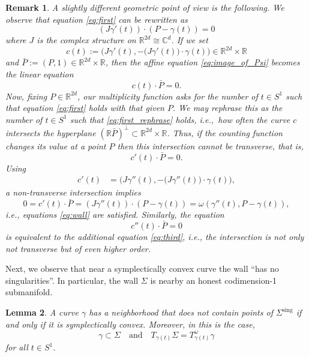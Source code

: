 \documentclass[12pt]{article}
\newtheorem{lemma}{Lemma}[section]
\newtheorem{remark}[lemma]{Remark}
\newcommand{\g}{{\gamma}}
\newcommand{\C}{{\mathbb C}}
\newcommand{\R}{{\mathbb R}}
\begin{document}
\begin{remark}
{A slightly different geometric point of view is the following. We observe that equation \eqref{eq:first} can be rewritten as
\begin{equation}\label{eq:image_of_Psi}
(J\gamma'(t))\cdot (P-\gamma(t))=0
\end{equation}
where $J$ is the complex structure on $\R^{2d}\cong\C^d$. If we set 
$$
c(t):=\Big(J\gamma'(t),-\big(J\gamma'(t)\big)\cdot\gamma(t) \Big)\in\R^{2d}\times\R
$$
and $\bar P:=(P,1)\in\R^{2d}\times\R$, then the affine equation \eqref{eq:image_of_Psi} becomes the linear equation
\begin{equation}\label{eq:first_rephrase}
c(t)\cdot \bar P=0.
\end{equation}
%
Now, fixing $P\in\R^{2d}$, our multiplicity function asks for the number of $t\in S^1$ such that equation \eqref{eq:first} holds with that given $P$. We may rephrase this as the number of $t\in S^1$ such that \eqref{eq:first_rephrase} holds, i.e.,~how often the curve $c$ intersects the hyperplane $(\R\bar P)^\perp\subset\R^{2d}\times\R$. Thus, if the counting function changes its value at a point $P$ then this  intersection cannot be transverse, that is, 
$$
c'(t)\cdot \bar P=0.
$$
Using
\begin{equation}\nonumber
\begin{aligned}
c'(t)%
&=\Big(J\gamma''(t),-\big(J\gamma''(t)\big)\cdot\gamma(t)\Big),
\end{aligned}
\end{equation}
a non-transverse intersection implies
\begin{equation}\nonumber
0=c'(t)\cdot \bar P=(J\gamma''(t))\cdot (P-\gamma(t))=\omega(\gamma''(t),P-\gamma(t)),
\end{equation}
i.e., equations \eqref{eq:wall} are satisfied.  Similarly, the equation 
$$
c''(t)\cdot\bar P=0
$$
is equivalent to the additional equation \eqref{eq:third}, i.e., the intersection is not only not transverse but of even higher order.
} 
\end{remark}

Next, we observe that near a symplectically convex curve the wall ``has no singularities''. In particular, the wall $\Sigma$ is nearby an honest codimension-1 submanifold.

\begin{lemma} \label{lm:near}
A  curve $\g$ has a neighborhood that does not contain points of $\Sigma^{\mathrm{sing}}$ if and only if it is symplectically convex. Moreover, in this is the case, 
$$
\g\subset\Sigma \quad\text{and}\quad T_{\g(t)}\Sigma=T_{\gamma(t)}^{\omega}\gamma
$$ 
for all $t\in S^1$.
\end{lemma}
\end{document}
